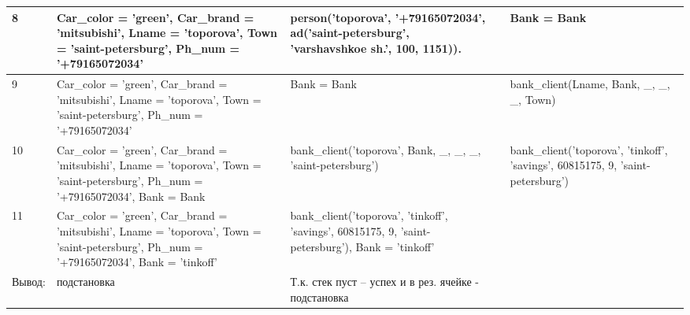 \begin{table}
\begin{tabular}{|p{1cm}|p{4cm}|p{5cm}|p{1cm}|p{5cm}|}
	\hline
	8 & Car\_color = 'green', Car\_brand = 'mitsubishi', Lname = 'toporova', Town = 'saint-petersburg', Ph\_num = '+79165072034' & person('toporova', '+79165072034', ad('saint-petersburg', 'varshavshkoe sh.', 100, 1151)). &  & Bank = Bank \\
	\hline
	9 & Car\_color = 'green', Car\_brand = 'mitsubishi', Lname = 'toporova', Town = 'saint-petersburg', Ph\_num = '+79165072034' & Bank = Bank &  & bank\_client(Lname, Bank, \_, \_, \_, Town) \\
	\hline
	10 & Car\_color = 'green', Car\_brand = 'mitsubishi', Lname = 'toporova', Town = 'saint-petersburg', Ph\_num = '+79165072034', Bank = Bank & bank\_client('toporova', Bank, \_, \_, \_, 'saint-petersburg') &  & bank\_client('toporova', 'tinkoff', 'savings', 60815175, 9, 'saint-petersburg') \\
	\hline
	11 & Car\_color = 'green', Car\_brand = 'mitsubishi', Lname = 'toporova', Town = 'saint-petersburg', Ph\_num = '+79165072034', Bank = 'tinkoff' & bank\_client('toporova', 'tinkoff', 'savings', 60815175, 9, 'saint-petersburg'), Bank = 'tinkoff' &  &  \\
	\hline
	Вывод: & подстановка & Т.к. стек пуст – успех и
	в рез. ячейке -  подстановка
	&  &  \\
	\hline

\end{tabular}
\end{table}
    